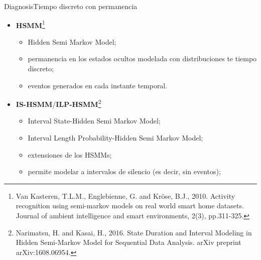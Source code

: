\documentclass[9pt, handout]{beamer}
\begin{document}
      \begin{frame}{Diagnosis}{Tiempo discreto con permanencia}
        \begin{itemize}
          \pause
          \item \textbf{HSMM}\footnote{Van Kasteren, T.L.M., Englebienne, G. and Kröse, B.J., 2010. Activity recognition using semi-markov models on real world smart home datasets. Journal of ambient intelligence and smart environments, 2(3), pp.311-325.}
          \begin{itemize}
            \item Hidden Semi Markov Model;
            \item permanencia en los estados ocultos modelada con distribuciones te tiempo discreto;
            \item eventos generados en cada instante temporal.
          \end{itemize}
          \pause
          \item \textbf{IS-HSMM}/\textbf{ILP-HSMM}\footnote{Narimatsu, H. and Kasai, H., 2016. State Duration and Interval Modeling in Hidden Semi-Markov Model for Sequential Data Analysis. arXiv preprint arXiv:1608.06954.}
          \begin{itemize}
            \item Interval State-Hidden Semi Markov Model;
            \item Interval Length Probability-Hidden Semi Markov Model;
            \item extensiones de los HSMMs;
            \item permite modelar a intervalos de silencio (es decir, sin eventos);
          \end{itemize}
        \end{itemize}
      \end{frame}
      
\end{document}
